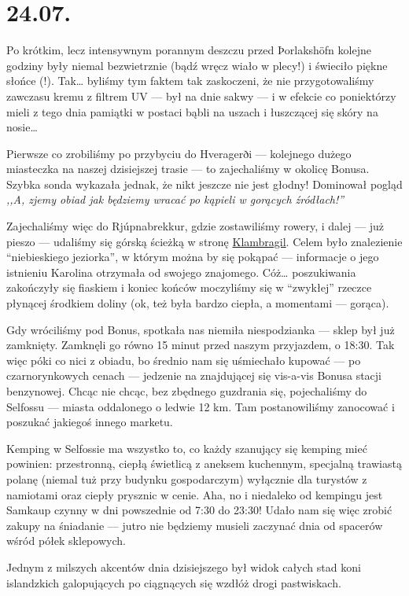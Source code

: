 \chapter*{24.07.}

Po krótkim, lecz intensywnym porannym deszczu przed Þorlakshöfn kolejne godziny były niemal bezwietrznie (bądź wręcz wiało w plecy!) i świeciło piękne słońce (!). Tak… byliśmy tym faktem tak zaskoczeni, że nie przygotowaliśmy zawczasu kremu z filtrem UV --- był na dnie sakwy --- i w efekcie co poniektórzy mieli z tego dnia pamiątki w postaci bąbli na uszach i łuszczącej się skóry na nosie…


Pierwsze co zrobiliśmy po przybyciu do Hveragerði --- kolejnego dużego miasteczka na naszej dzisiejszej trasie --- to zajechaliśmy w okolicę Bonusa. Szybka sonda wykazała jednak, że nikt jeszcze nie jest głodny! Dominował pogląd \emph{,,A, zjemy obiad jak będziemy wracać po kąpieli w gorących źródłach!''}

Zajechaliśmy więc do Rjúpnabrekkur, gdzie zostawiliśmy rowery, i dalej --- już pieszo --- udaliśmy się górską ścieżką w stronę \href{http://www.vulkaner.no/t/isl2004/hot.html}{Klambragil}. Celem było znalezienie “niebieskiego jeziorka”, w którym można by się pokąpać --- informacje o jego istnieniu Karolina otrzymała od swojego znajomego. Cóż… poszukiwania zakończyły się fiaskiem i koniec końców moczyliśmy się w “zwykłej” rzeczce płynącej środkiem doliny (ok, też była bardzo ciepła, a momentami --- gorąca).


Gdy wróciliśmy pod Bonus, spotkała nas niemiła niespodzianka --- sklep był już zamknięty. Zamknęli go równo 15 minut przed naszym przyjazdem, o 18:30. Tak więc póki co nici z obiadu, bo średnio nam się uśmiechało kupować --- po czarnorynkowych cenach --- jedzenie na znajdującej się vis-a-vis Bonusa stacji benzynowej. Chcąc nie chcąc, bez zbędnego guzdrania się, pojechaliśmy do Selfossu --- miasta oddalonego o ledwie 12 km. Tam postanowiliśmy zanocować i poszukać jakiegoś innego marketu.

Kemping w Selfossie ma wszystko to, co każdy szanujący się kemping mieć powinien: przestronną, ciepłą świetlicą z aneksem kuchennym, specjalną trawiastą polanę (niemal tuż przy budynku gospodarczym) wyłącznie dla turystów z namiotami oraz ciepły prysznic w cenie. Aha, no i niedaleko od kempingu jest Samkaup czynny w dni powszednie od 7:30 do 23:30! Udało nam się więc zrobić zakupy na śniadanie --- jutro nie będziemy musieli zaczynać dnia od spacerów wśród półek sklepowych.

Jednym z milszych akcentów dnia dzisiejszego był widok całych stad koni islandzkich galopujących po ciągnących się wzdłóż drogi pastwiskach.